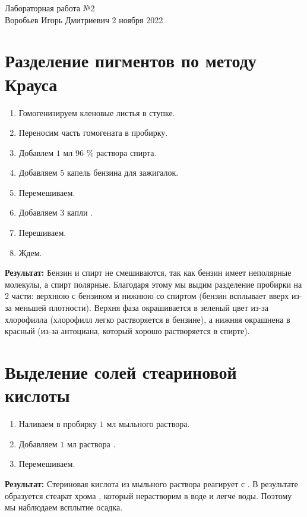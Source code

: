 \documentclass[12pt, letterpaper, twoside]{article}
\begin{document}
\begin{center}
	\LARGE{Лабораторная работа №2}\\[0.2cm]
	\large{Воробьев Игорь Дмитриевич}
	\large{2 ноября 2022}
\end{center}

\section{Разделение пигментов по методу Крауса}
\begin{enumerate}
	\item Гомогенизируем кленовые листья в ступке.
	\item Переносим часть гомогената в пробирку.
	\item Добавлем $1$ мл 96 \% раствора спирта.
	\item Добавляем $5$ капель бензина для зажигалок.
	\item Перемешиваем.
	\item Добавляем $3$ капли .
	\item Перешиваем.
	\item Ждем.
\end{enumerate}
\textbf{Результат:} Бензин и спирт не смешиваются, так как бензин имеет неполярные молекулы, а спирт полярные. Благодаря этому мы выдим разделение пробирки на 2 части: верхнюю с бензином и нижнюю со спиртом (бензин всплывает вверх из-за меньшей плотности). Верхня фаза окрашивается в зеленый цвет из-за хлорофилла (хлорофилл легко растворяется в бензине), а нижняя окрашнена в красный (из-за антоциана, который хорошо растворяется в спирте).

\section{Выделение солей стеариновой кислоты}
\begin{enumerate}
	\item Наливаем в пробирку $1$ мл мыльного раствора.
	\item Добавляем $1$ мл раствора .
	\item Перемешиваем.
\end{enumerate}
\textbf{Результат:} Стериновая кислота из мыльного раствора  реагирует с . В результате образуется стеарат хрома , который нерастворим в воде и легче воды. Поэтому мы наблюдаем всплытие осадка. 
\end{document}
